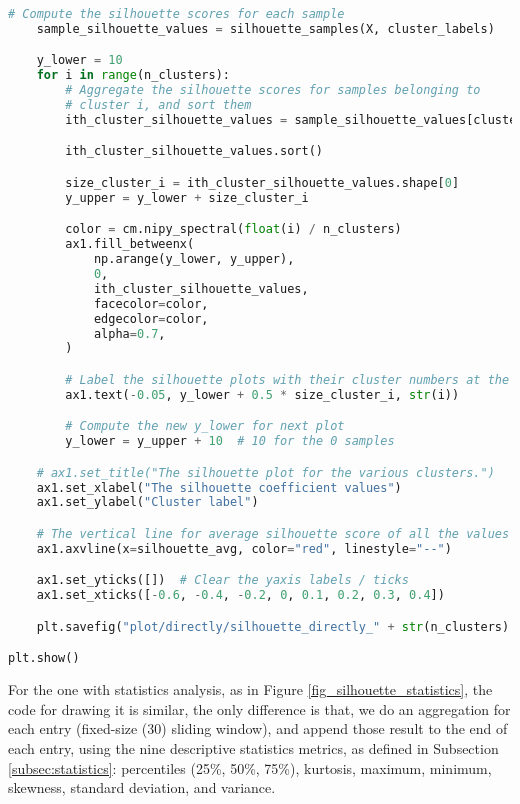 \begin{lstlisting}[language=Python]
    # Compute the silhouette scores for each sample
    sample_silhouette_values = silhouette_samples(X, cluster_labels)

    y_lower = 10
    for i in range(n_clusters):
        # Aggregate the silhouette scores for samples belonging to
        # cluster i, and sort them
        ith_cluster_silhouette_values = sample_silhouette_values[cluster_labels == i]

        ith_cluster_silhouette_values.sort()

        size_cluster_i = ith_cluster_silhouette_values.shape[0]
        y_upper = y_lower + size_cluster_i

        color = cm.nipy_spectral(float(i) / n_clusters)
        ax1.fill_betweenx(
            np.arange(y_lower, y_upper),
            0,
            ith_cluster_silhouette_values,
            facecolor=color,
            edgecolor=color,
            alpha=0.7,
        )

        # Label the silhouette plots with their cluster numbers at the middle
        ax1.text(-0.05, y_lower + 0.5 * size_cluster_i, str(i))

        # Compute the new y_lower for next plot
        y_lower = y_upper + 10  # 10 for the 0 samples

    # ax1.set_title("The silhouette plot for the various clusters.")
    ax1.set_xlabel("The silhouette coefficient values")
    ax1.set_ylabel("Cluster label")

    # The vertical line for average silhouette score of all the values
    ax1.axvline(x=silhouette_avg, color="red", linestyle="--")

    ax1.set_yticks([])  # Clear the yaxis labels / ticks
    ax1.set_xticks([-0.6, -0.4, -0.2, 0, 0.1, 0.2, 0.3, 0.4])

    plt.savefig("plot/directly/silhouette_directly_" + str(n_clusters) + ".pdf", format="pdf", bbox_inches="tight")

plt.show()
\end{lstlisting}

For the one with statistics analysis, as in Figure \ref{fig_silhouette_statistics}, the code for drawing it is similar, the only difference is that, we do an aggregation for each entry (fixed-size (30) sliding window), and append those result to the end of each entry, using the nine descriptive statistics metrics, as defined in Subsection \ref{subsec:statistics}: percentiles (25\%, 50\%, 75\%), kurtosis, maximum, minimum, skewness, standard deviation, and variance.
